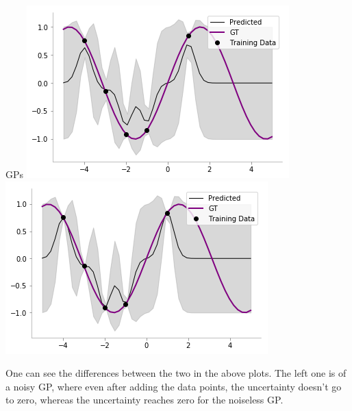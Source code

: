 \documentclass{beamer}
\begin{document}
\begin{frame}{GPs}
	\includegraphics[width=.5\textwidth]{gp/final/noisygp}%
	\includegraphics[width=.5\textwidth]{gp/final/noiselessgp}
	
	One can see the differences between the two in the above plots. The left one is of a noisy GP, where even after adding the data points, the uncertainty doesn't go to zero, whereas the uncertainty reaches zero for the noiseless GP.
\end{frame}

	
	
\end{document}
